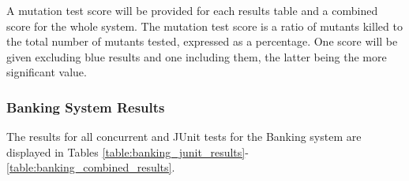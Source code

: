 \documentclass[a4paper,12pt]{article}
\begin{document}
A mutation test score will be provided for each results table and a combined score for the whole system. The mutation test score is a ratio of mutants killed to the total number of mutants tested, expressed as a percentage. One score will be given excluding blue results and one including them, the latter being the more significant value. 

\subsubsection{Banking System Results} \label{section:Banking System Results}

The results for all concurrent and JUnit tests for the Banking system are displayed in Tables \ref{table:banking_junit_results}-\ref{table:banking_combined_results}. 
\end{document}
